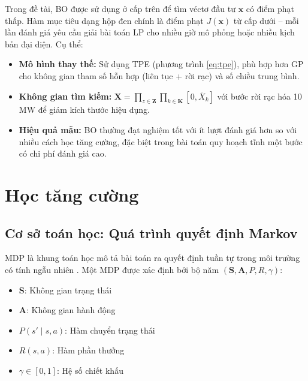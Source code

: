 Trong đề tài, BO được sử dụng ở cấp trên để tìm véctơ đầu tư $\mathbf{x}$ có điểm phạt thấp. Hàm mục tiêu dạng hộp đen chính là điểm phạt $J(\mathbf{x})$ từ cấp dưới -- mỗi lần đánh giá yêu cầu giải bài toán LP cho nhiều giờ mô phỏng hoặc nhiều kịch bản đại diện. Cụ thể:

\begin{itemize}
    \item \textbf{Mô hình thay thế:} Sử dụng TPE (phương trình \ref{eq:tpe}), phù hợp hơn GP cho không gian tham số hỗn hợp (liên tục + rời rạc) và số chiều trung bình.
    
    \item \textbf{Không gian tìm kiếm:} $\mathbf{X} = \prod_{z \in \mathbf{Z}} \prod_{k \in \mathbf{K}} [0, \overline{X}_k]$ với bước rời rạc hóa 10 MW để giảm kích thước hiệu dụng.
    
    \item \textbf{Hiệu quả mẫu:} BO thường đạt nghiệm tốt với ít lượt đánh giá hơn so với nhiều cách học tăng cường, đặc biệt trong bài toán quy hoạch tĩnh một bước có chi phí đánh giá cao.
\end{itemize}
\fi

\section{Học tăng cường}

\subsection{Cơ sở toán học: Quá trình quyết định Markov}

MDP là khung toán học mô tả bài toán ra quyết định tuần tự trong môi trường có tính ngẫu nhiên \cite{puterman1994mdp}. Một MDP được xác định bởi bộ năm $(\mathbf{S}, \mathbf{A}, P, R, \gamma)$:

\begin{itemize}
    \item $\mathbf{S}$: Không gian trạng thái
    \item $\mathbf{A}$: Không gian hành động
    \item $P(s' \mid s, a)$: Hàm chuyển trạng thái
    \item $R(s, a)$: Hàm phần thưởng
    \item $\gamma \in [0, 1]$: Hệ số chiết khấu
\end{itemize}

